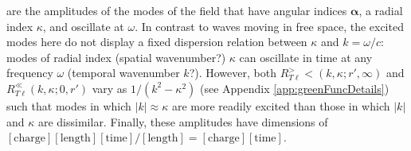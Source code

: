 \documentclass{article}
\begin{document}
are the amplitudes of the modes of the field that have angular indices $\bm{\alpha}$, a radial index $\kappa$, and oscillate at $\omega$. In contrast to waves moving in free space, the excited modes here do not display a fixed dispersion relation between $\kappa$ and $k = \omega/c$: modes of radial index (spatial wavenumber?) $\kappa$ can oscillate in time at any frequency $\omega$ (temporal wavenumber $k$?). However, both $R_{T\ell}^><(k,\kappa;r',\infty)$ and $R_{T\ell}^\ll(k,\kappa;0,r')$ vary as $1/(k^2 - \kappa^2)$ (see Appendix \ref{app:greenFuncDetails}) such that modes in which $|k|\approx\kappa$ are more readily excited than those in which $|k|$ and $\kappa$ are dissimilar. Finally, these amplitudes have dimensions of $[\mathrm{charge}][\mathrm{length}][\mathrm{time}]/[\mathrm{length}] = [\mathrm{charge}][\mathrm{time}]$.
\end{document}
